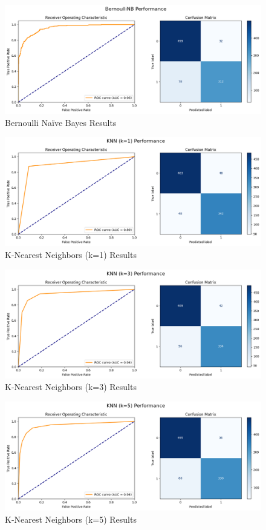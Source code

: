 \documentclass[12pt]{article}
\begin{document}
\begin{figure}[H]
\centering
\includegraphics[width=1\textwidth]{images/naivebayes3.png}
\caption{Bernoulli Na\"ive Bayes Results}
\end{figure}

\begin{figure}[H]
\centering
\includegraphics[width=1\textwidth]{images/knn1.png}
\caption{K-Nearest Neighbors (k=1) Results}
\end{figure}
\begin{figure}[H]
\centering
\includegraphics[width=1\textwidth]{images/knn2.png}
\caption{K-Nearest Neighbors (k=3) Results}
\end{figure}

\begin{figure}[H]
\centering
\includegraphics[width=1\textwidth]{images/knn3.png}
\caption{K-Nearest Neighbors (k=5) Results}
\end{figure}
\end{document}
